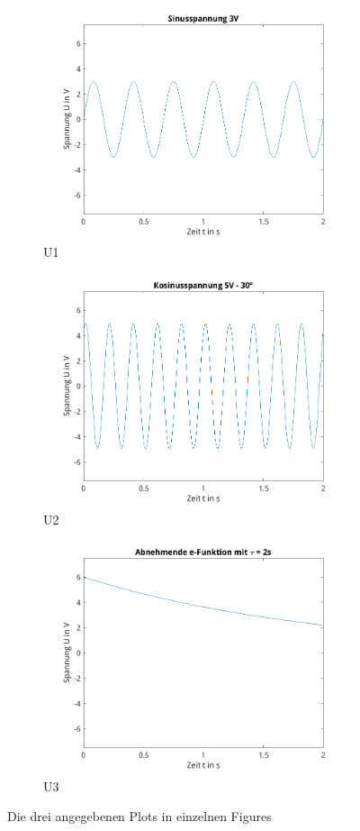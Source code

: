 \documentclass{article}
\begin{document}
\begin{figure}[!h]
  \begin{subfigure}{.33\textwidth}
    \centering
    \includegraphics[width=.8\linewidth]{../assets/images/ET2P6/Sinusspannung3V.png}
    \caption{U1}
  \end{subfigure}
  \begin{subfigure}{.33\textwidth}
    \centering
    \includegraphics[width=.8\linewidth]{../assets/images/ET2P6/Kosinusspannung5V.png}
    \caption{U2}
  \end{subfigure}
  \begin{subfigure}{.33\textwidth}
    \centering
    \includegraphics[width=.8\linewidth]{../assets/images/ET2P6/eFunk2s.png}
    \caption{U3}
  \end{subfigure}
  \caption{Die drei angegebenen Plots in einzelnen Figures}
\end{figure}
\end{document}
